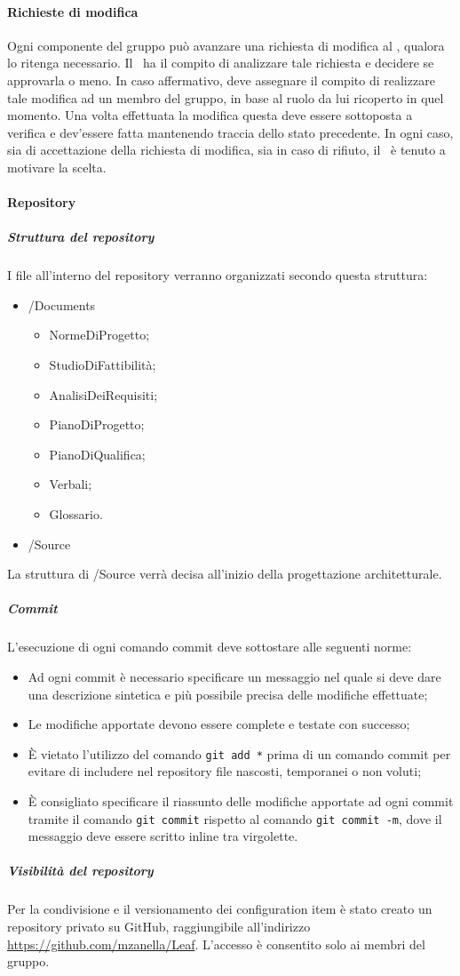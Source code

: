\documentclass[../NormeProgetto.tex]{subfiles}
\begin{document}
	\paragraph{Richieste di modifica}
	Ogni componente del gruppo può avanzare una richiesta di modifica al \responsabilediprogetto, qualora lo ritenga necessario. Il \responsabilediprogetto\ ha il compito di analizzare tale richiesta e decidere se approvarla o meno. In caso affermativo, deve assegnare il compito di realizzare tale modifica ad un membro del gruppo, in base al ruolo da lui ricoperto in quel momento. Una volta effettuata la modifica questa deve essere sottoposta a verifica e dev'essere fatta mantenendo traccia dello stato precedente. In ogni caso, sia di accettazione della richiesta di modifica, sia in caso di rifiuto, il \responsabilediprogetto\ è tenuto a motivare la scelta.
	\paragraph{Repository}	
		\subparagraph{Struttura del repository}
	I file all'interno del repository verranno organizzati secondo questa struttura:
	\begin{itemize}
		\item /Documents
		\begin{itemize}
			\item NormeDiProgetto;
			\item StudioDiFattibilità;
			\item AnalisiDeiRequisiti;
			\item PianoDiProgetto;
			\item PianoDiQualifica;
			\item Verbali;
			\item Glossario.
		\end{itemize}
		\item /Source
	\end{itemize}
	La struttura di /Source verrà decisa all'inizio della progettazione architetturale.
		\subparagraph{Commit}
	L'esecuzione di ogni comando commit deve sottostare alle seguenti norme:
	\begin{itemize}
		\item Ad ogni commit è necessario specificare un messaggio nel quale si deve dare una descrizione sintetica e più possibile precisa delle modifiche effettuate;
		\item Le modifiche apportate devono essere complete e testate con successo;
		\item È vietato l'utilizzo del comando \texttt{git add *} prima di un comando commit per evitare di includere nel repository file nascosti, temporanei o non voluti;
		\item È consigliato specificare il riassunto delle modifiche apportate ad ogni commit tramite il comando \texttt{git commit} rispetto al comando \texttt{git commit -m}, dove il messaggio deve essere scritto inline tra virgolette.
	\end{itemize}
		\subparagraph{Visibilità del repository}
	Per la condivisione e il versionamento dei configuration item è stato creato un repository privato su GitHub, raggiungibile all'indirizzo \url{https://github.com/mzanella/Leaf}. L'accesso è consentito solo ai membri del gruppo.	
\end{document}
